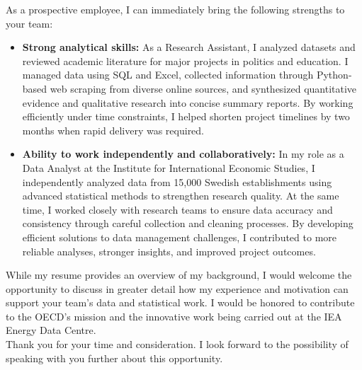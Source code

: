 \documentclass[11pt,a4paper,roman]{moderncv}
\begin{document}
As a prospective employee, I can immediately bring the following strengths to your team:
\vspace{0.5em}
\begin{itemize}
\item \textbf{Strong analytical skills:} As a Research Assistant, I analyzed datasets and reviewed academic literature for major projects in politics and education. I managed data using SQL and Excel, collected information through Python-based web scraping from diverse online sources, and synthesized quantitative evidence and qualitative research into concise summary reports. By working efficiently under time constraints, I helped shorten project timelines by two months when rapid delivery was required.
\item \textbf{Ability to work independently and collaboratively:} In my role as a Data Analyst at the Institute for International Economic Studies, I independently analyzed data from 15,000 Swedish establishments using advanced statistical methods to strengthen research quality. At the same time, I worked closely with research teams to ensure data accuracy and consistency through careful collection and cleaning processes. By developing efficient solutions to data management challenges, I contributed to more reliable analyses, stronger insights, and improved project outcomes.
\end{itemize}

\vspace{1em}
While my resume provides an overview of my background, I would welcome the opportunity to discuss in greater detail how my experience and motivation can support your team's data and statistical work. I would be honored to contribute to the OECD's mission and the innovative work being carried out at the IEA Energy Data Centre.\\

\vspace{1em}
Thank you for your time and consideration. I look forward to the possibility of speaking with you further about this opportunity.

\vspace{0.5cm}


\makeletterclosing
\end{document}
